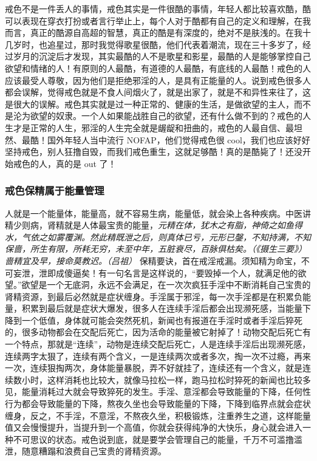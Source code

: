 戒色不是一件丢人的事情，戒色其实是一件很酷的事情，年轻人都比较喜欢酷，酷可以表现在穿衣打扮或者言行举止上，每个人对于酷都有自己的定义和理解，在我而言，真正的酷源自高超的智慧，真正的酷是有深度的，绝对不是肤浅的。在我十几岁时，也追星过，那时我觉得歌星很酷，他们代表着潮流，现在三十多岁了，经过岁月的沉淀后才发现，其实最酷的人不是歌星和影星，最酷的人是能够掌控自己欲望和情绪的人！有原则的人最酷，有道德的人最酷，有底线的人最酷！戒色的人应该最受人尊敬，因为他们是拒绝邪淫的人，是具有正能量的人。说到戒色很多人都会误解，觉得戒色就是不食人间烟火了，就是出家了，就是不和异性来往了，这是很大的误解。戒色其实就是过一种正常的、健康的生活，是做欲望的主人，而不是沦为欲望的奴隶。一个人如果能战胜自己的欲望，还有什么做不到的？戒色的人生才是正常的人生，邪淫的人生完全就是龌龊和扭曲的，戒色的人最自信、最坦然、最酷！国外年轻人当中流行 NOFAP，他们觉得戒色很 cool，我们也应该好好坚持戒色，别人狂撸自毁，而我们戒色重生，这就足够酷！真的是酷毙了！还没开始戒色的人，真的是 out 了！

\subsubsection{戒色保精属于能量管理}

人就是一个能量体，能量高，就不容易生病，能量低，就会染上各种疾病。中医讲精少则病，肾精就是人体最宝贵的能量，\textit{元精在体，犹木之有脂，神倚之如鱼得水，气依之如雾覆渊。然此精既泄之后，则真体已亏，元形已鏧，不知持满，不知保啬，所生有限，所耗无穷，未至中年，五脏衰尽，百脉俱枯矣。（《摄生三要》）} \textit{啬精宜及早，接命莫教迟。（吕祖）} 保精要诀，首在戒淫戒漏。须知精为命宝，不可妄泄，泄即成傻逼矣！有一句名言是这样说的，“要毁掉一个人，就满足他的欲望。”欲望是一个无底洞，永远不会满足，在一次次疯狂手淫中不断消耗自己宝贵的肾精资源，到最后必然就是症状缠身。手淫属于邪淫，每一次手淫都是在积累负能量，积累到最后就是症状大爆发，很多人在连续手淫后都会出现濒死感，当能量下降到一个低值，身体就可能会突然死机，新闻也有报道在手淫时或者手淫后猝死的，很多动物都会在交配后死亡，因为活命的能量被它射掉了！动物交配后死亡有一个特点，那就是“连续”，动物是连续交配后死亡，人是连续手淫后出现濒死感，连续两字太狠了，连续有两个含义，一是连续两次或者多次，掏一次不过瘾，再来一次，连续狠掏两次，身体能量暴脱，弄不好就挂了，连续还有一个含义，就是连续数小时，这样消耗也比较大，就像马拉松一样，跑马拉松时猝死的新闻也比较多见，能量消耗过大就会导致猝死的发生。手淫、意淫都会导致能量的下降，任何性行为都会导致能量的下降，熬夜久坐也会导致能量的下降，下降到临界点就会症状缠身，反之，不手淫，不意淫，不熬夜久坐，积极锻炼，注重养生之道，这样能量值又会慢慢提升，当提升到一个高值，你就会获得纯净的大快乐，身心就会进入一种不可思议的状态。戒色说到底，就是要学会管理自己的能量，千万不可滥撸滥泄，随意糟蹋和浪费自己宝贵的肾精资源。

